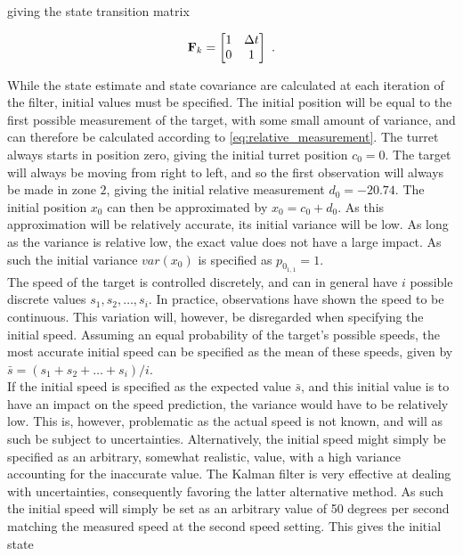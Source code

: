giving the state transition matrix

\begin{equation}
\label{eq:state_trans_matrix}
    \mathbf{F}_k =
    \begin{bmatrix}
      1 & \Delta t \\
      0 & 1
    \end{bmatrix}
    \text{ .}
\end{equation}

While the state estimate and state covariance are calculated at each iteration of the filter, initial values must be specified. The initial position will be equal to the first possible measurement of the target, with some small amount of variance, and can therefore be calculated according to \cref{eq:relative_measurement}. The turret always starts in position zero, giving the initial turret position $c_0=0$. The target will always be moving from right to left, and so the first observation will always be made in zone $2$, giving the initial relative measurement $d_0=-20.74$. The initial position $x_0$ can then be approximated by $x_0 = c_0+d_0$. As this approximation will be relatively accurate, its initial variance will be low. As long as the variance is relative low, the exact value does not have a large impact. As such the initial variance $var(x_0)$ is specified as $p_{0_{1,1}} = 1$. \\

The speed of the target is controlled discretely, and can in general have $i$ possible discrete values $s_1, s_2, \dots, s_i$. In practice, observations have shown the speed to be continuous. This variation will, however, be disregarded when specifying the initial speed. Assuming an equal probability of the target's possible speeds, the most accurate initial speed can be specified as the mean of these speeds, given by $\bar{s}=(s_1+s_2+\dots+s_i)/i$.  \\

If the initial speed is specified as the expected value $\bar{s}$, and this initial value is to have an impact on the speed prediction, the variance would have to be relatively low. This is, however, problematic as the actual speed is not known, and will as such be subject to uncertainties. Alternatively, the initial speed might simply be specified as an arbitrary, somewhat realistic, value, with a high variance accounting for the inaccurate value. The Kalman filter is very effective at dealing with uncertainties, consequently favoring the latter alternative method. As such the initial speed will simply be set as an arbitrary value of 50 degrees per second matching the measured speed at the second speed setting. This gives the initial state

